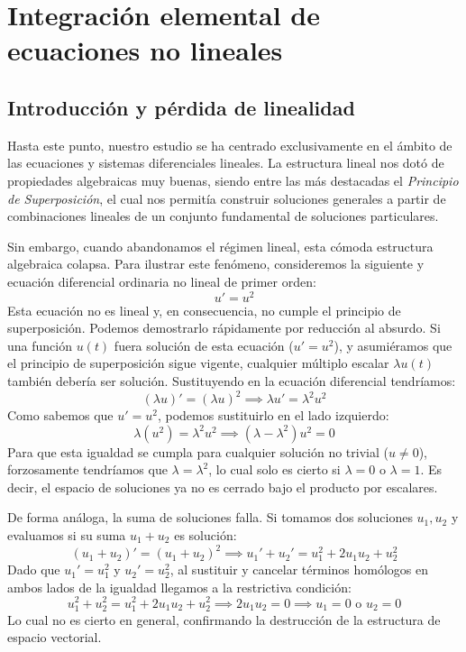 \section{Integración elemental de ecuaciones no lineales}

\subsection{Introducción y pérdida de linealidad}

Hasta este punto, nuestro estudio se ha centrado exclusivamente en el ámbito de las ecuaciones y sistemas diferenciales lineales. La estructura lineal nos dotó de propiedades algebraicas muy buenas, siendo entre las más  destacadas el \textit{Principio de Superposición}, el cual nos permitía construir soluciones generales a partir de combinaciones lineales de un conjunto fundamental de soluciones particulares. 

Sin embargo, cuando abandonamos el régimen lineal, esta cómoda estructura algebraica colapsa. Para ilustrar este fenómeno, consideremos la siguiente y ecuación diferencial ordinaria no lineal de primer orden:
\[
    u' = u^2
\]
Esta ecuación no es lineal y, en consecuencia, no cumple el principio de superposición. Podemos demostrarlo rápidamente por reducción al absurdo. Si una función $u(t)$ fuera solución de esta ecuación ($u' = u^2$), y asumiéramos que el principio de superposición sigue vigente, cualquier múltiplo escalar $\lambda u(t)$ también debería ser solución. Sustituyendo en la ecuación diferencial tendríamos:
\[
    (\lambda u)' = (\lambda u)^2 \implies \lambda u' = \lambda^2 u^2
\]
Como sabemos que $u' = u^2$, podemos sustituirlo en el lado izquierdo:
\[
    \lambda (u^2) = \lambda^2 u^2 \implies (\lambda - \lambda^2)u^2 = 0
\]
Para que esta igualdad se cumpla para cualquier solución no trivial ($u \neq 0$), forzosamente tendríamos que $\lambda = \lambda^2$, lo cual solo es cierto si $\lambda = 0$ o $\lambda = 1$. Es decir, el espacio de soluciones ya no es cerrado bajo el producto por escalares. 

De forma análoga, la suma de soluciones falla. Si tomamos dos soluciones $u_1, u_2$ y evaluamos si su suma $u_1 + u_2$ es solución:
\[
    (u_1 + u_2)' = (u_1 + u_2)^2 \implies u_1' + u_2' = u_1^2 + 2u_1u_2 + u_2^2
\]
Dado que $u_1' = u_1^2$ y $u_2' = u_2^2$, al sustituir y cancelar términos homólogos en ambos lados de la igualdad llegamos a la restrictiva condición:
\[
    u_1^2 + u_2^2 = u_1^2 + 2u_1u_2 + u_2^2 \implies 2u_1 u_2 = 0 \implies u_1 = 0 \text{ o } u_2 = 0
\]
Lo cual no es cierto en general, confirmando la destrucción de la estructura de espacio vectorial.

